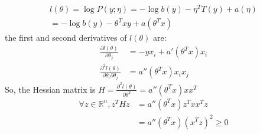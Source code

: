 \begin{answer}
\begin{align*}
    l(\theta) = \log P(y;\eta) = -\log b(y)-\eta^T T(y)+a(\eta)\\
    =-\log b(y) - \theta^T x y + a(\theta^T x)
\end{align*}
the first and second derivatives of $l(\theta)$ are:
\begin{align*}
    \frac{\partial l(\theta)}{\partial \theta_j} &= -y x_i + a'(\theta^T x)x_i\\
    \frac{\partial^2 l(\theta)}{\partial \theta_i \partial \theta_j} &= a''(\theta^T x)x_i x_j
\end{align*}
So, the Hessian matrix is $H = \frac{\partial^2 l(\theta)}{\partial \theta^2} = a''(\theta^T x) x x^T$
\begin{align*}
    \forall z \in \mathbb{R}^n, z^T H z &= a''(\theta^T x) z^T x x^T z\\
    &= a''(\theta^T x) (x^T z)^2 \geq 0
\end{align*}
\end{answer}

